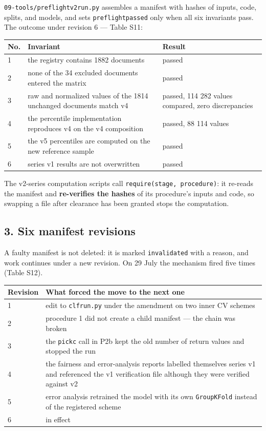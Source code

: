 \documentclass[11pt,a4paper]{article}
\renewcommand{\_}{\textunderscore\allowbreak}
\begin{document}
\texttt{09-\allowbreak{}tools/preflight\_v2\_run.py} assembles a manifest with hashes of inputs, code, splits, and models, and sets \texttt{preflight\_passed} only when all six invariants pass. The outcome under revision 6 — Table S11:

\begin{center}
\small
\begin{tabularx}{\textwidth}{lXX}
\toprule
No. & Invariant & Result \\
\midrule
1 & the registry contains 1882 documents & passed \\
2 & none of the 34 excluded documents entered the matrix & passed \\
3 & raw and normalized values of the 1814 unchanged documents match v4 & passed, 114 282 values compared, zero discrepancies \\
4 & the percentile implementation reproduces v4 on the v4 composition & passed, 88 114 values \\
5 & the v5 percentiles are computed on the new reference sample & passed \\
6 & series v1 results are not overwritten & passed \\
\bottomrule
\end{tabularx}
\end{center}

The v2-series computation scripts call \texttt{require(stage, procedure)}: it re-reads the manifest and \textbf{re-verifies the hashes} of its procedure's inputs and code, so swapping a file after clearance has been granted stops the computation.

\subsection{3. Six manifest revisions}

A faulty manifest is not deleted: it is marked \texttt{invalidated} with a reason, and work continues under a new revision. On 29 July the mechanism fired five times (Table S12).

\begin{center}
\small
\begin{tabularx}{\textwidth}{lX}
\toprule
Revision & What forced the move to the next one \\
\midrule
1 & edit to \texttt{clf\_run.py} under the amendment on two inner CV schemes \\
2 & procedure 1 did not create a child manifest — the chain was broken \\
3 & the \texttt{pick\_c} call in P2b kept the old number of return values and stopped the run \\
4 & the fairness and error-analysis reports labelled themselves series v1 and referenced the v1 verification file although they were verified against v2 \\
5 & error analysis retrained the model with its own \texttt{GroupKFold} instead of the registered scheme \\
6 & in effect \\
\bottomrule
\end{tabularx}
\end{center}
\end{document}
